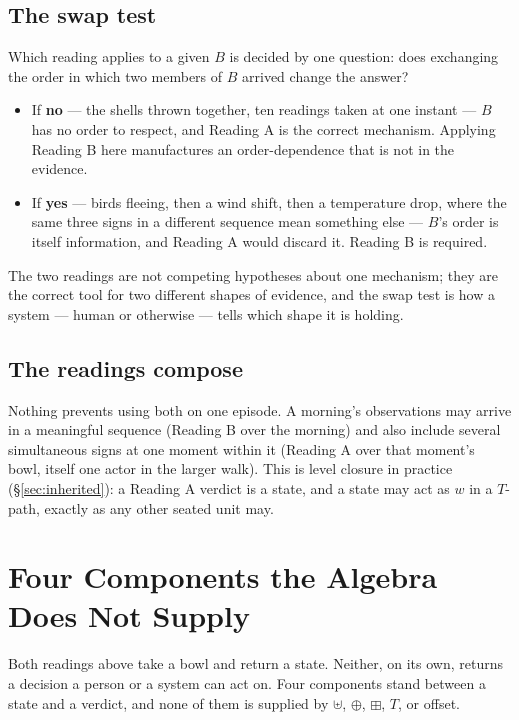 \documentclass[12pt, a4paper]{article}
\begin{document}
\subsection{The swap test}
\label{subsec:swap_test}
Which reading applies to a given $B$ is decided by one question: does
exchanging the order in which two members of $B$ arrived change the
answer?
\begin{itemize}
\item If \textbf{no} --- the shells thrown together, ten readings
      taken at one instant --- $B$ has no order to respect, and
      Reading A is the correct mechanism. Applying Reading B here
      manufactures an order-dependence that is not in the evidence.
\item If \textbf{yes} --- birds fleeing, then a wind shift, then a
      temperature drop, where the same three signs in a different
      sequence mean something else --- $B$'s order is itself
      information, and Reading A would discard it. Reading B is
      required.
\end{itemize}
The two readings are not competing hypotheses about one mechanism;
they are the correct tool for two different shapes of evidence, and
the swap test is how a system --- human or otherwise --- tells which
shape it is holding.

\subsection{The readings compose}
\label{subsec:readings_compose}
Nothing prevents using both on one episode. A morning's observations
may arrive in a meaningful sequence (Reading B over the morning) and
also include several simultaneous signs at one moment within it
(Reading A over that moment's bowl, itself one actor in the larger
walk). This is level closure in practice (\S\ref{sec:inherited}): a
Reading A verdict is a state, and a state may act as $w$ in a $T$-path,
exactly as any other seated unit may.

\section{Four Components the Algebra Does Not Supply}
\label{sec:four_gaps}

Both readings above take a bowl and return a state. Neither, on its
own, returns a decision a person or a system can act on. Four
components stand between a state and a verdict, and none of them is supplied by $\uplus$, $\oplus$, $\boxplus$, $T$, or offset.
\end{document}
